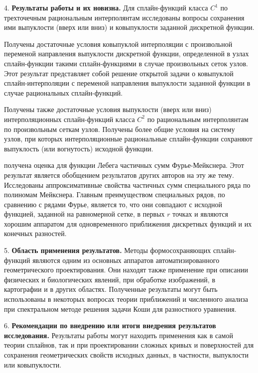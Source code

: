 4. \textbf{ Результаты работы и их новизна.} Для  сплайн-функций класса $C^1$ по трехточечным
 рациональным интерполянтам исследованы вопросы сохранения ими выпуклости (вверх или вниз)
 и ковыпуклости заданной дискретной функции.

Получены достаточные условия ковыпуклой интерполяции с произвольной переменой направления
выпуклости дискретной функции, определенной в узлах сплайн-функции такими сплайн-функциями
в случае  произвольных сеток узлов. Этот результат представляет собой решение
открытой задачи о ковыпуклой сплайн-интерполяции с переменой направления выпуклости заданной
функции в случае рациональных сплайн-функций.

Получены также достаточные условия выпуклости (вверх или вниз) интерполяционных
сплайн-функций класса $C^2$ по рациональным интерполянтам по произвольным сеткам узлов.
Получены более общие условия на систему узлов, при которых интерполяционные
рациональные сплайн-функции сохраняют выпуклость (или вогнутость) исходной функции. 

получена оценка для функции Лебега частичных сумм Фурье-Мейкснера. Этот результат является обобщением результатов других авторов на эту же тему.
                                        Исследованы аппроксимативные свойства частичных сумм специального ряда по полиномам Мейкснера.
                                        Главным преимуществом специальных рядов, по сравнению с рядами Фурье, является то, что они совпадают с исходной функцией,
                                        заданной на равномерной сетке,  в первых $r$ точках и являются хорошим аппаратом для одновременного приближения
                                        дискретных функций и их конечных разностей.


5. \textbf{ Область применения результатов.} Методы формосохраняющих сплайн-функций являются одним
из основных аппаратов автоматизированного геометрического проектирования. Они находят
также применение при описании физических и биологических явлений, при обработке изображений,
в картографии и в других областях. Полученные результаты могут быть использованы в некоторых вопросах теории приближений и
                                численного анализа при спектральном методе решения задачи Коши для разностного уравнения.

6. \textbf{ Рекомендации по внедрению  или итоги внедрения результатов исследования.} Результаты
работы могут находить применения как в самой теории сплайнов, так и при проектировании
сложных кривых и поверхностей для сохранения геометрических свойств исходных данных,
в частности, выпуклости или ковыпуклости.


